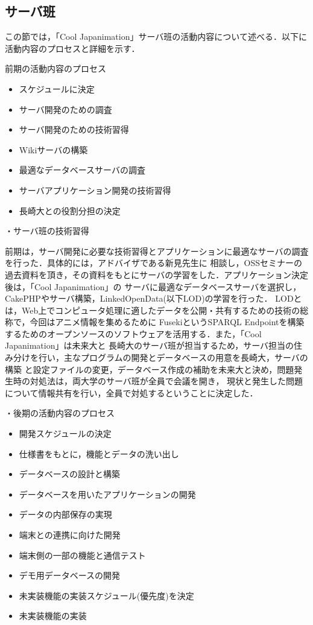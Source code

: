 \subsection{サーバ班}
\par
この節では，「Cool Japanimation」サーバ班の活動内容について述べる．以下に活動内容のプロセスと詳細を示す．
\par
前期の活動内容のプロセス

\begin{itemize}
\item スケジュールに決定
\item サーバ開発のための調査
\item サーバ開発のための技術習得
\item Wikiサーバの構築
\item 最適なデータベースサーバの調査
\item サーバアプリケーション開発の技術習得
\item 長崎大との役割分担の決定
\end{itemize}

\par
・サーバ班の技術習得
\par
前期は，サーバ開発に必要な技術習得とアプリケーションに最適なサーバの調査を行った．具体的には，アドバイザである新見先生に
相談し，OSSセミナーの過去資料を頂き，その資料をもとにサーバの学習をした．アプリケーション決定後は，「Cool Japanimation」の
サーバに最適なデータベースサーバを選択し，CakePHPやサーバ構築，LinkedOpenData(以下LOD)の学習を行った．
LODとは，Web上でコンピュータ処理に適したデータを公開・共有するための技術の総称で，今回はアニメ情報を集めるために
FusekiというSPARQL Endpointを構築するためのオープンソースのソフトウェアを活用する．また，「Cool Japanimation」は未来大と
長崎大のサーバ班が担当するため，サーバ担当の住み分けを行い，主なプログラムの開発とデータベースの用意を長崎大，サーバの構築
と設定ファイルの変更，データベース作成の補助を未来大と決め，問題発生時の対処法は，両大学のサーバ班が全員で会議を開き，
現状と発生した問題について情報共有を行い，全員で対処するということに決定した．

\par
・後期の活動内容のプロセス
\begin{itemize}
\item 開発スケジュールの決定
\item 仕様書をもとに，機能とデータの洗い出し
\item データベースの設計と構築
\item データベースを用いたアプリケーションの開発
\item データの内部保存の実現
\item 端末との連携に向けた開発
\item 端末側の一部の機能と通信テスト
\item デモ用データベースの開発
\item 未実装機能の実装スケジュール(優先度)を決定
\item 未実装機能の実装
\end{itemize}

